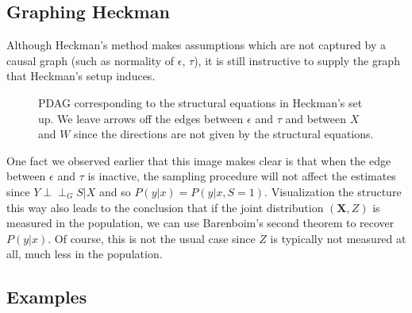 \documentclass[12pt,twoside]{reedthesis}
\theoremstyle{definition}
\newcommand{\dsep}{\perp \!\!\!\perp}
\begin{document}
\subsection{Graphing Heckman}
Although Heckman's method makes assumptions which are not captured by a causal graph (such as normality of $\epsilon$, $\tau$), it is still instructive to supply the graph that Heckman's setup induces. 

\begin{figure}[H]
\begin{center}
\end{center}
\caption{PDAG corresponding to the structural equations in Heckman's set up. We leave arrows off the edges between $\epsilon$ and $\tau$ and between $X$ and $W$ since the directions are not given by the structural equations.}
\end{figure}

One fact we observed earlier that this image makes clear is that when the edge between $\epsilon$ and $\tau$ is inactive, the sampling procedure will not affect the estimates since $Y \dsep_G S | X$ and so $P(y| x) = P(y|x, S = 1)$. Visualization the structure this way also leads to the conclusion that if the joint distribution $(\mathbf{X},Z)$ is measured in the population, we can use Barenboim's second theorem to recover $P(y|x)$. Of course, this is not the usual case since $Z$ is typically not measured at all, much less in the population.



\subsection{Examples}
\end{document}
